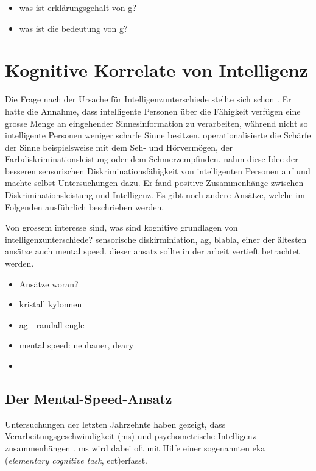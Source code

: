 \documentclass[11pt, twoside, a4paper]{book}		%
\begin{document}
\begin{itemize}
	\item was ist erklärungsgehalt von g?
	\item was ist die bedeutung von g?
\end{itemize}




\section{Kognitive Korrelate von Intelligenz}

Die Frage nach der Ursache für Intelligenzunterschiede stellte sich schon \citet{Galton1883}. Er hatte die Annahme, dass intelligente Personen über die Fähigkeit verfügen eine grosse Menge an eingehender Sinnesinformation zu verarbeiten, während nicht so intelligente Personen weniger scharfe Sinne besitzen. \citeauthor{Galton1883} operationalisierte die Schärfe der Sinne beispielsweise mit dem Seh- und Hörvermögen, der Farbdiskriminationsleistung oder dem Schmerzempfinden. \citet{Spearman1904} nahm diese Idee der besseren sensorischen Diskriminationsfähigkeit von intelligenten Personen auf und machte selbst Untersuchungen dazu. Er fand positive Zusammenhänge zwischen Diskriminationsleistung und Intelligenz. Es gibt noch andere Ansätze, welche im Folgenden ausführlich beschrieben werden.

Von grossem interesse sind, was sind kognitive grundlagen von intelligenzunterschiede? sensorische diskirminiation, ag, blabla, einer der ältesten ansätze auch mental speed. dieser ansatz sollte in der arbeit vertieft betrachtet werden.

\begin{itemize}
	\item Ansätze woran?
	\item kristall kylonnen
	\item ag - randall engle
	\item mental speed: neubauer, deary
	\item 
\end{itemize}

\subsection{Der Mental-Speed-Ansatz}

Untersuchungen der letzten Jahrzehnte  haben gezeigt, dass Verarbeitungsgeschwindigkeit (\gls{ms}) und psychometrische Intelligenz zusammenhängen \citep[für Übersichtsarbeiten siehe][]{Deary2000a, Jensen2006, Sheppard2008}. \gls{ms} wird dabei oft mit Hilfe einer sogenannten \gls{eka} (\textit{elementary cognitive task}, ect)erfasst. 
\end{document}
